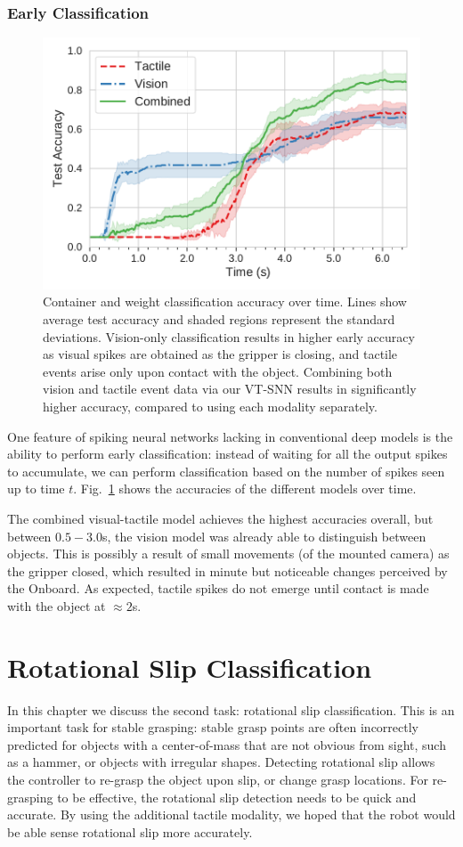 \documentclass[fyp]{socreport}
\begin{document}
\subsection{Early Classification}

\begin{figure}
  \centering
  \includegraphics[width=0.45\columnwidth]{images/analysis/object_det_over_time.pdf}
  \caption{Container and weight classification accuracy over time. Lines show
    average test accuracy and shaded regions represent the standard deviations.
    Vision-only classification results in higher early accuracy as visual spikes
    are obtained as the gripper is closing, and tactile events arise only upon
    contact with the object. Combining both vision and tactile event data via
    our VT-SNN results in significantly higher accuracy, compared to using each
    modality separately.\label{fig:classtime}}
\end{figure}

One feature of spiking neural networks lacking in conventional deep models is
the ability to perform early classification: instead of waiting for all the
output spikes to accumulate, we can perform classification based on the number
of spikes seen up to time $t$. Fig.~\ref{fig:classtime} shows the accuracies of
the different models over time.

The combined visual-tactile model achieves the highest accuracies overall, but
between $0.5-3.0$s, the vision model was already able to distinguish between
objects. This is possibly a result of small movements (of the mounted camera) as
the gripper closed, which resulted in minute but noticeable changes perceived by
the Onboard. As expected, tactile spikes do not emerge until contact is made
with the object at $\approx 2$s.

\chapter{Rotational Slip Classification\label{cha:slippage}}

In this chapter we discuss the second task: rotational slip classification. This
is an important task for stable grasping: stable grasp points are often
incorrectly predicted for objects with a center-of-mass that are not obvious
from sight, such as a hammer, or objects with irregular shapes. Detecting
rotational slip allows the controller to re-grasp the object upon slip, or
change grasp locations. For re-grasping to be effective, the rotational slip
detection needs to be quick and accurate. By using the additional tactile
modality, we hoped that the robot would be able sense rotational slip more
accurately.
\end{document}
